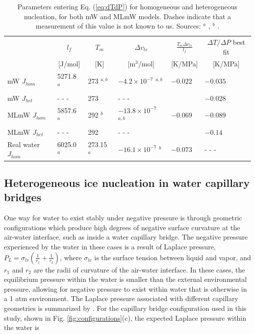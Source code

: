 \documentclass[journal abbreviation, manuscript]{copernicus}
\begin{document}
\begin{table}
\begin{tabular}{ |p{2.60cm}||p{2.2cm}|p{2.2cm}|p{2.2cm}|p{2.2cm}|p{2.5cm}|  }
 \hline
 & \multicolumn{1}{|c|}{$l_f$}  
 & \multicolumn{1}{|c|}{$T_m$}
 & \multicolumn{1}{|c|}{$\Delta v_{ls}$}
 & \multicolumn{1}{|c|}{$\frac{T_m \Delta v_{ls}}{l_f}$ } 
 & \multicolumn{1}{|c|}{$\Delta T/ \Delta P$ best fit }\\
 & \multicolumn{1}{|c|}{[J/mol] }  
 & \multicolumn{1}{|c|}{[K] }
 & \multicolumn{1}{|c|}{[m$^3$/mol]  }        
 & \multicolumn{1}{|c|}{[K/MPa] }                           
 & \multicolumn{1}{|c|}{[K/MPa] }\\
 \hline
 mW $J_{hom}$   & 5271.8 $^a$           & 273 $^{a,b}$  &  $-4.2 \times 10^{-7}$ $^{a,b}$     & $-0.022$    & $-0.035$ \\
 mW $J_{het}$   & - - -   & 273           & - - -   &           & $-0.028$ \\
 MLmW $J_{hom}$ & 5857.6 $^a$           & 292 $^b$      & $-13.8 \times 10^{-7}$ $^{a,b}$     & $-0.069$    & $-0.089$ \\
 MLmW $J_{het}$ & - - -   & 292           & - - -   &           & $-0.14$ \\
 Real water $J_{hom}$ & 6025.0 $^a$     & 273.15 $^a$   & $-16.1 \times 10^{-7}$ $^{b}$       & $-0.073$    & - - - \\
 \hline
\end{tabular}
\caption{\label{tab:slopes} Parameters entering Eq. (\ref{eq:dTdP}) for homogeneous and heterogeneous nucleation, for both mW and MLmW models. Dashes indicate that a measurement of this value is not known to us. Sources: $^a$ \citet{chan2019}, $^b$ \citet{rosky2022}.}
\end{table}




\subsection{Heterogeneous ice nucleation in water capillary bridges} \label{capillary}

One way for water to exist stably under negative pressure is through geometric configurations which produce high degrees of negative surface curvature at the air-water interface, such as inside a water capillary bridge. The negative pressure experienced by the water in these cases is a result of Laplace pressure, $P_L = \sigma_{lv}(\frac{1}{r_1}+\frac{1}{r_2})$, where $\sigma_{lv}$ is the surface tension between liquid and vapor, and $r_1$ and $r_2$ are the radii of curvature of the air-water interface. In these cases, the equilibrium pressure within the water is smaller than the external environmental pressure, allowing for negative pressure to exist within water that is otherwise in a 1 atm environment. The Laplace pressure associated with different capillary geometries is summarized by \citet{elliott2021}. For the capillary bridge configuration used in this study, shown in Fig. \ref{fig:configurations}(c), the expected Laplace pressure within the water is
\end{document}
